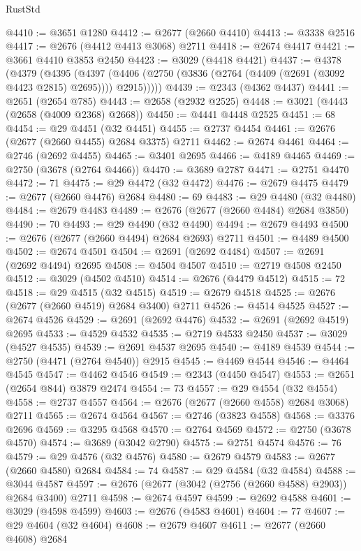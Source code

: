 \begin{lexlean}{RustStd}
\begin{coremodule}
@4410 := @3651 @1280
@4412 := @2677 (@2660 @4410)
@4413 := @3338 @2516
@4417 := @2676 (@4412 @4413 @3068) @2711
@4418 := @2674 @4417
@4421 := @3661 @4410 @3853 @2450
@4423 := @3029 (@4418 @4421)
@4437 := @4378
    (@4379
      (@4395
        (@4397 (@4406 (@2750 (@3836 (@2764 (@4409 (@2691 (@3092 @4423 @2815) @2695)))) @2915)))))
@4439 := @2343 (@4362 @4437)
@4441 := @2651 (@2654 @785)
@4443 := @2658 (@2932 @2525)
@4448 := @3021 (@4443 (@2658 (@4009 @2368) @2668))
@4450 := @4441 @4448 @2525
@4451 := 68
@4454 := @29 @4451 (@32 @4451)
@4455 := @2737 @4454
@4461 := @2676 (@2677 (@2660 @4455) @2684 @3375) @2711
@4462 := @2674 @4461
@4464 := @2746 (@2692 @4455)
@4465 := @3401 @2695
@4466 := @4189 @4465
@4469 := @2750 (@3678 (@2764 @4466))
@4470 := @3689 @2787
@4471 := @2751 @4470
@4472 := 71
@4475 := @29 @4472 (@32 @4472)
@4476 := @2679 @4475
@4479 := @2677 (@2660 @4476) @2684
@4480 := 69
@4483 := @29 @4480 (@32 @4480)
@4484 := @2679 @4483
@4489 := @2676 (@2677 (@2660 @4484) @2684 @3850)
@4490 := 70
@4493 := @29 @4490 (@32 @4490)
@4494 := @2679 @4493
@4500 := @2676 (@2677 (@2660 @4494) @2684 @2693) @2711
@4501 := @4489 @4500
@4502 := @2674 @4501
@4504 := @2691 (@2692 @4484)
@4507 := @2691 (@2692 @4494) @2695
@4508 := @4504 @4507
@4510 := @2719 @4508 @2450
@4512 := @3029 (@4502 @4510)
@4514 := @2676 (@4479 @4512)
@4515 := 72
@4518 := @29 @4515 (@32 @4515)
@4519 := @2679 @4518
@4525 := @2676 (@2677 (@2660 @4519) @2684 @3400) @2711
@4526 := @4514 @4525
@4527 := @2674 @4526
@4529 := @2691 (@2692 @4476)
@4532 := @2691 (@2692 @4519) @2695
@4533 := @4529 @4532
@4535 := @2719 @4533 @2450
@4537 := @3029 (@4527 @4535)
@4539 := @2691 @4537 @2695
@4540 := @4189 @4539
@4544 := @2750 (@4471 (@2764 @4540)) @2915
@4545 := @4469 @4544
@4546 := @4464 @4545
@4547 := @4462 @4546
@4549 := @2343 (@4450 @4547)
@4553 := @2651 (@2654 @844) @3879 @2474
@4554 := 73
@4557 := @29 @4554 (@32 @4554)
@4558 := @2737 @4557
@4564 := @2676 (@2677 (@2660 @4558) @2684 @3068) @2711
@4565 := @2674 @4564
@4567 := @2746 (@3823 @4558)
@4568 := @3376 @2696
@4569 := @3295 @4568
@4570 := @2764 @4569
@4572 := @2750 (@3678 @4570)
@4574 := @3689 (@3042 @2790)
@4575 := @2751 @4574
@4576 := 76
@4579 := @29 @4576 (@32 @4576)
@4580 := @2679 @4579
@4583 := @2677 (@2660 @4580) @2684
@4584 := 74
@4587 := @29 @4584 (@32 @4584)
@4588 := @3044 @4587
@4597 := @2676 (@2677 (@3042 (@2756 (@2660 @4588) @2903)) @2684 @3400) @2711
@4598 := @2674 @4597
@4599 := @2692 @4588
@4601 := @3029 (@4598 @4599)
@4603 := @2676 (@4583 @4601)
@4604 := 77
@4607 := @29 @4604 (@32 @4604)
@4608 := @2679 @4607
@4611 := @2677 (@2660 @4608) @2684

\end{coremodule}
\end{lexlean}
